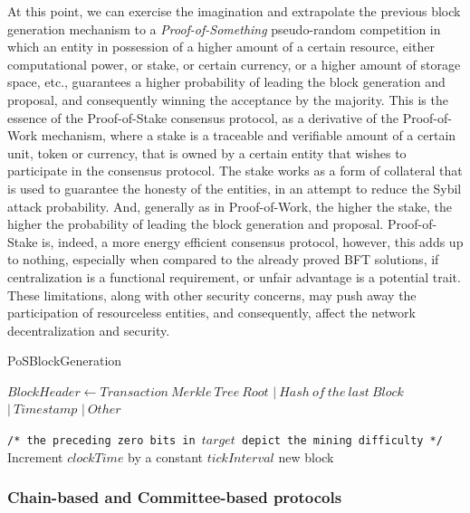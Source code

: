 \documentclass[journal]{IEEEtran}
\newcommand{\LineComment}[1]{\State \texttt{/* #1 */}}
\begin{document}
At this point, we can exercise the imagination and extrapolate the
previous block generation mechanism to a \emph{Proof-of-Something} 
pseudo-random competition in which an entity in possession of a higher
amount of a certain resource, either computational power, or stake, 
or certain currency, or a higher amount of storage space, etc., guarantees
a higher probability of leading the block generation and proposal, and
consequently winning the acceptance by the majority. This is the essence of
the Proof-of-Stake consensus protocol, as a derivative of the Proof-of-Work
mechanism, where a stake is a traceable and verifiable amount of a certain
unit, token or currency, that is owned by a certain entity that wishes to
participate in the consensus protocol. The stake works as a form of collateral
that is used to guarantee the honesty of the entities, in an attempt to
reduce the Sybil attack probability. And, generally as in Proof-of-Work, 
the higher the stake, the higher the probability of leading the block generation 
and proposal. Proof-of-Stake is, indeed, a more energy efficient consensus protocol,
however, this adds up to nothing, especially when compared to the already proved
BFT solutions, if centralization is a functional requirement, 
or unfair advantage is a potential trait. 
These limitations, along with other security concerns, may push away the 
participation of resourceless entities, and consequently, affect the network
decentralization and security.

\begin{algorithm}
  \caption[short]{PoSBlockGeneration}\label{alg:PoSBlockGeneration}
  \begin{algorithmic}[1]
    \Function {}{}
      \State $Block Header \gets Transaction \ Merkle \ Tree \ Root$
      \Indent
        \State $| \ Hash \ of \ the \ last \ Block$
        \State $| \ Timestamp$
        \State $| \ Other$
      \EndIndent
      
      \LineComment{the preceding zero bits in $target$ depict the mining difficulty}
      \State Increment $clockTime$ by a constant $tickInterval$
      \EndWhile
      \State \Return new block
    \EndFunction
  \end{algorithmic}
\end{algorithm}

\subsubsection{Chain-based and Committee-based protocols}
\end{document}
